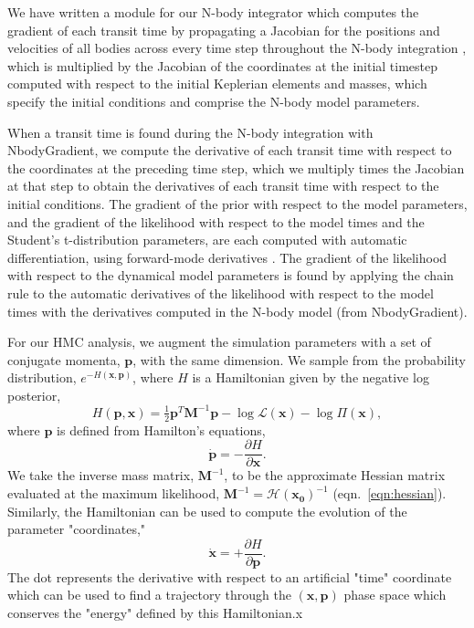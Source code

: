 \documentclass[fleqn,usenatbib]{mnras} %
\begin{document}
We have written a module for our N-body integrator which computes the
gradient of each transit time by propagating a Jacobian for the positions
and velocities of all bodies across every time step throughout the N-body
integration \citep{Agol2020}, which is multiplied by the Jacobian of the coordinates at the initial timestep computed with respect to the initial Keplerian elements and masses, which specify the initial conditions and comprise the N-body model parameters.  

When a transit time is found during the N-body integration with \textsf{NbodyGradient}, we compute the derivative of each transit time with respect to 
the coordinates at the preceding time step, which we multiply times the Jacobian 
at that step to obtain the derivatives of each transit time with respect to the 
initial conditions. 
The gradient of the prior with respect to the model parameters, and the gradient of the likelihood with respect to the model times and the Student's t-distribution parameters, are each computed with automatic 
differentiation, using forward-mode derivatives  \citep{Revels2016}.  The gradient of the likelihood with
respect to the dynamical model parameters is found by applying the chain rule to the automatic derivatives of the likelihood with respect to the model times with the derivatives computed in the N-body model (from \textsf{NbodyGradient}).


For our HMC analysis, we augment the simulation parameters with a set of conjugate momenta, $\mathbf{p}$, with the same dimension. We sample from the probability distribution, $e^{-H(\mathbf{x},\mathbf{p})}$, where $H$ is a Hamiltonian given by the negative log posterior,
\begin{equation}
    H(\mathbf{p},\mathbf{x}) = \tfrac{1}{2} \mathbf{p}^T \mathbf{M}^{-1} \mathbf{p}
    - \log{\mathcal{L}}(\mathbf{x}) - \log{\Pi(\mathbf{x})},
\end{equation}
where $\mathbf{p}$ is defined from Hamilton's equations,
\begin{equation}
    \dot{\mathbf{p}} = -\frac{\partial H}{\partial \mathbf{x}}.
\end{equation}
We take the inverse mass matrix, $\mathbf{M}^{-1}$, to be the approximate Hessian matrix evaluated at the maximum likelihood, $\mathbf{M}^{-1} = \mathbf{\mathcal{H}(\mathbf{x}_0)}^{-1}$ (eqn.\ \ref{eqn:hessian}).
Similarly, the Hamiltonian can be used to compute the evolution of the parameter "coordinates,"
\begin{equation}
    \dot{\mathbf{x}} = +\frac{\partial H}{\partial \mathbf{p}}.
\end{equation}
The dot represents the derivative with respect to an artificial "time" coordinate which can be used to find a trajectory through the $(\mathbf{x},\mathbf{p})$ phase space which conserves the "energy" defined by this Hamiltonian.x
\end{document}
